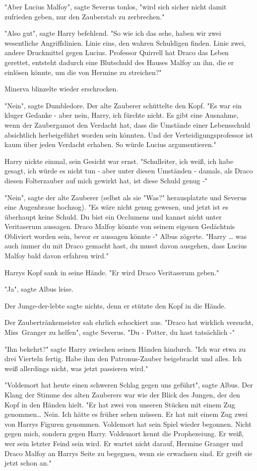 {"Aber Lucius Malfoy", sagte Severus tonlos, "wird sich sicher nicht damit zufrieden geben, nur den Zauberstab zu zerbrechen."

"Also gut", sagte Harry befehlend. "So wie ich das sehe, haben wir zwei wesentliche Angriffslinien. Linie eins, den wahren Schuldigen finden. Linie zwei, andere Druckmittel gegen Lucius. Professor Quirrell hat Draco das Leben gerettet, entsteht dadurch eine Blutschuld des Hauses Malfoy an ihn, die er einlösen könnte, um die von Hermine zu streichen?"

Minerva blinzelte wieder erschrocken.

"Nein", sagte Dumbledore. Der alte Zauberer schüttelte den Kopf. "Es war ein kluger Gedanke - aber nein, Harry, ich fürchte nicht. Es gibt eine Ausnahme, wenn der Zaubergamot den Verdacht hat, dass die Umstände einer Lebensschuld absichtlich herbeigeführt worden sein könnten. Und der Verteidigungsprofessor ist kaum über jeden Verdacht erhaben. So würde Lucius argumentieren."

Harry nickte einmal, sein Gesicht war ernst. "Schulleiter, ich weiß, ich habe gesagt, ich würde es nicht tun - aber unter diesen Umständen - damals, als Draco diesen Folterzauber auf mich gewirkt hat, ist diese Schuld genug -"

"Nein", sagte der alte Zauberer (selbst als sie "Was?" herausplatzte und Severus eine Augenbraue hochzog). "Es wäre nicht genug gewesen, und jetzt ist es überhaupt keine Schuld. Du bist ein Occlumens und kannst nicht unter Veritaserum aussagen. Draco Malfoy könnte von seinem eigenen Gedächtnis Obliviert worden sein, bevor er aussagen könnte -" Albus zögerte. "Harry … was auch immer du mit Draco gemacht hast, du musst davon ausgehen, dass Lucius Malfoy bald davon erfahren wird."

Harrys Kopf sank in seine Hände. "Er wird Draco Veritaserum geben."

"Ja", sagte Albus leise.

Der Junge-der-lebte sagte nichts, denn er stützte den Kopf in die Hände.

Der Zaubertränkemeister sah ehrlich schockiert aus. "Draco hat wirklich versucht, Miss~Granger zu helfen", sagte Severus. "Du - Potter, du hast tatsächlich -"

"Ihn bekehrt?" sagte Harry zwischen seinen Händen hindurch. "Ich war etwa zu drei Vierteln fertig. Habe ihm den Patronus-Zauber beigebracht und alles. Ich weiß allerdings nicht, was jetzt passieren wird."

"Voldemort hat heute einen schweren Schlag gegen uns geführt", sagte Albus. Der Klang der Stimme des alten Zauberers war wie der Blick des Jungen, der den Kopf in den Händen hielt. "Er hat zwei von unseren Stücken mit einem Zug genommen… Nein. Ich hätte es früher sehen müssen. Er hat mit einem Zug zwei von Harrys Figuren genommen. Voldemort hat sein Spiel wieder begonnen. Nicht gegen mich, sondern gegen Harry. Voldemort kennt die Prophezeiung. Er weiß, wer sein letzter Feind sein wird. Er wartet nicht darauf, Hermine Granger und Draco Malfoy an Harrys Seite zu begegnen, wenn sie erwachsen sind. Er greift sie jetzt schon an."

}
